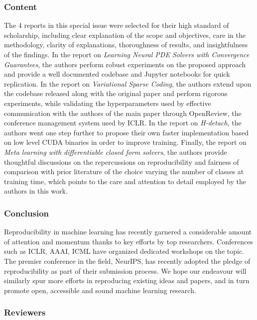 \subsubsection{Content}  

The 4 reports in this special issue were selected for their high standard of scholarship, including clear explanation of the scope and objectives, care in the methodology, clarity of explanations, thoroughness of results, and insightfulness of the findings.   In the report on \textit{Learning Neural PDE Solvers with Convergence Guarantees}, the authors perform robust experiments on the proposed approach and provide a well documented codebase and Jupyter notebooks for quick replication. In the report on \textit{Variational Sparse Coding}, the authors extend upon the codebase released along with the original paper and perform rigorous experiments, while validating the hyperparameters used by effective communication with the authors of the main paper through OpenReview, the conference management system used by ICLR. In the report on \textit{H-detach}, the authors went one step further to propose their own faster implementation based on low level CUDA binaries in order to improve training. Finally, the report on \textit{Meta learning with differentiable closed form solvers}, the authors provide thoughtful discussions on the repercussions on reproducibility and fairness of comparison with prior literature of the choice varying the number of classes at training time, which points to the care and attention to detail employed by the authors in this work. 

\subsubsection{Conclusion}

Reproducibility in machine learning has recently garnered a considerable amount of attention and momentum thanks to key efforts by top researchers. Conferences such as ICLR, AAAI, ICML have organized dedicated workshops on the topic. The premier conference in the field, NeurIPS, has recently adopted the pledge of reproducibility as part of their submission process. We hope our endeavour will similarly spur more efforts in reproducing existing ideas and papers, and in turn promote open, accessible and sound machine learning research.  

\subsubsection{Reviewers}

